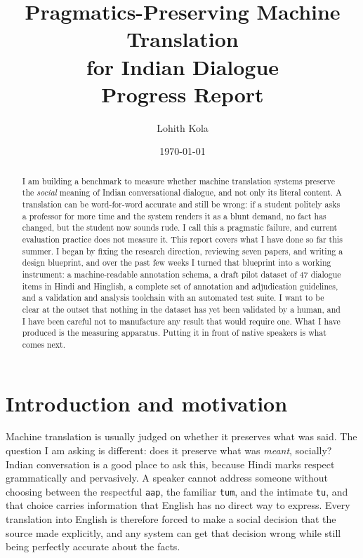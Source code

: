 \documentclass[11pt]{article}
\title{\bfseries Pragmatics-Preserving Machine Translation\\ for Indian Dialogue\\[4pt]
\large Progress Report}
\author{Lohith Kola} %
\date{\today}
\newcommand{\code}[1]{\texttt{\small #1}}
\begin{document}
\maketitle

\begin{abstract}
\noindent
I am building a benchmark to measure whether machine translation systems preserve
the \emph{social} meaning of Indian conversational dialogue, and not only its
literal content. A translation can be word-for-word accurate and still be wrong:
if a student politely asks a professor for more time and the system renders it as a
blunt demand, no fact has changed, but the student now sounds rude. I call this a
pragmatic failure, and current evaluation practice does not measure it. This report
covers what I have done so far this summer. I began by fixing the research
direction, reviewing seven papers, and writing a design blueprint, and over the past
few weeks I turned that blueprint into a working instrument: a machine-readable
annotation schema, a draft pilot dataset of 47 dialogue items in Hindi and Hinglish,
a complete set of annotation and adjudication guidelines, and a validation and
analysis toolchain with an automated test suite. I want to be clear at the outset
that nothing in the dataset has yet been validated by a human, and I have been
careful not to manufacture any result that would require one. What I have produced
is the measuring apparatus. Putting it in front of native speakers is what comes
next.
\end{abstract}

\section{Introduction and motivation}

Machine translation is usually judged on whether it preserves what was said. The
question I am asking is different: does it preserve what was \emph{meant}, socially?
Indian conversation is a good place to ask this, because Hindi marks respect
grammatically and pervasively. A speaker cannot address someone without choosing
between the respectful \code{aap}, the familiar \code{tum}, and the intimate
\code{tu}, and that choice carries information that English has no direct way to
express. Every translation into English is therefore forced to make a social
decision that the source made explicitly, and any system can get that decision
wrong while still being perfectly accurate about the facts.
\end{document}

